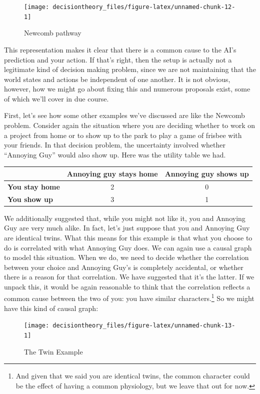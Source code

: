 \documentclass[]{tufte-book}
\begin{document}
\begin{figure}
\texttt{[image: decisiontheory\_files/figure-latex/unnamed-chunk-12-1]} \caption[Newcomb pathway]{Newcomb pathway}\label{fig:unnamed-chunk-12}
\end{figure}

This representation makes it clear that there is a common cause to the AI's prediction and your action. If that's right, then the setup is actually not a legitimate kind of decision making problem, since we are not maintaining that the world states and actions be independent of one another. It is not obvious, however, how we might go about fixing this and numerous proposals exist, some of which we'll cover in due course.

First, let's see how some other examples we've discussed are like the Newcomb problem. Consider again the situation where you are deciding whether to work on a project from home or to show up to the park to play a game of frisbee with your friends. In that decision problem, the uncertainty involved whether ``Annoying Guy'' would also show up. Here was the utility table we had.

\begin{longtable}[]{@{}lcc@{}}
\toprule
& Annoying guy stays home & Annoying guy shows up\tabularnewline
\midrule
\endhead
\textbf{You stay home} & 2 & 0\tabularnewline
\textbf{You show up} & 3 & 1\tabularnewline
\bottomrule
\end{longtable}

We additionally suggested that, while you might not like it, you and Annoying Guy are very much alike. In fact, let's just suppose that you and Annoying Guy are identical twins. What this means for this example is that what you choose to do is correlated with what Annoying Guy does. We can again use a causal graph to model this situation. When we do, we need to decide whether the correlation between your choice and Annoying Guy's is completely accidental, or whether there is a reason for that correlation. We have suggested that it's the latter. If we unpack this, it would be again reasonable to think that the correlation reflects a common cause between the two of you: you have similar characters.\footnote{And given that we said you are identical twins, the common character could be the effect of having a common physiology, but we leave that out for now.} So we might have this kind of causal graph:

\begin{figure}
\texttt{[image: decisiontheory\_files/figure-latex/unnamed-chunk-13-1]} \caption[The Twin Example]{The Twin Example}\label{fig:unnamed-chunk-13}
\end{figure}
\end{document}
